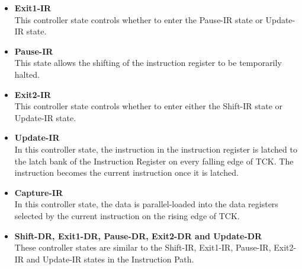 \documentclass[a4paper,11pt]{article}
\begin{document}
\begin{itemize}[noitemsep]
\item \textbf{Exit1-IR} \\This controller state controls whether to enter the Pause-IR state or Update-IR state.
\item \textbf{Pause-IR} \\This state allows the shifting of the instruction register to be temporarily halted.
\item \textbf{Exit2-IR} \\This controller state controls whether to enter either the Shift-IR state or Update-IR state.
\item \textbf{Update-IR} \\In this controller state, the instruction in the instruction register is latched to the latch bank of the Instruction Register on every falling edge of TCK. The instruction becomes the current instruction once it is latched.
\item \textbf{Capture-IR} \\In this controller state, the data is parallel-loaded into the data registers selected by the current instruction on the rising edge of TCK.
\item \textbf{Shift-DR, Exit1-DR, Pause-DR, Exit2-DR and Update-DR} \\These controller states are similar to the Shift-IR, Exit1-IR, Pause-IR, Exit2-IR and Update-IR states in the Instruction Path.\cite{TAPController}
\end{itemize}
\end{document}
